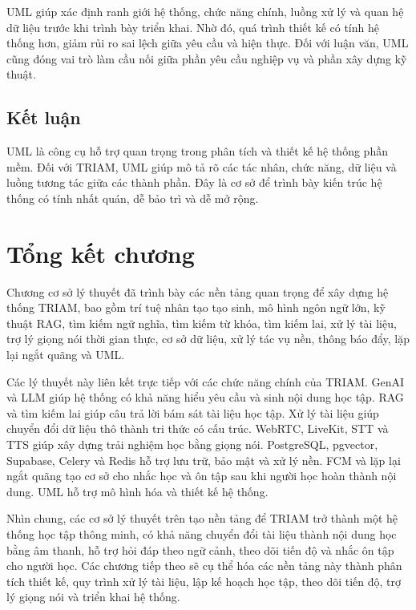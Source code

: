\documentclass[12pt,a4paper]{report}
\begin{document}
UML giúp xác định ranh giới hệ thống, chức năng chính, luồng xử lý và quan hệ dữ liệu trước khi trình bày triển khai. Nhờ đó, quá trình thiết kế có tính hệ thống hơn, giảm rủi ro sai lệch giữa yêu cầu và hiện thực. Đối với luận văn, UML cũng đóng vai trò làm cầu nối giữa phần yêu cầu nghiệp vụ và phần xây dựng kỹ thuật.

\subsection{Kết luận}

UML là công cụ hỗ trợ quan trọng trong phân tích và thiết kế hệ thống phần mềm. Đối với TRIAM, UML giúp mô tả rõ các tác nhân, chức năng, dữ liệu và luồng tương tác giữa các thành phần. Đây là cơ sở để trình bày kiến trúc hệ thống có tính nhất quán, dễ bảo trì và dễ mở rộng.

\section{Tổng kết chương}

Chương cơ sở lý thuyết đã trình bày các nền tảng quan trọng để xây dựng hệ thống TRIAM, bao gồm trí tuệ nhân tạo tạo sinh, mô hình ngôn ngữ lớn, kỹ thuật RAG, tìm kiếm ngữ nghĩa, tìm kiếm từ khóa, tìm kiếm lai, xử lý tài liệu, trợ lý giọng nói thời gian thực, cơ sở dữ liệu, xử lý tác vụ nền, thông báo đẩy, lặp lại ngắt quãng và UML.

Các lý thuyết này liên kết trực tiếp với các chức năng chính của TRIAM. GenAI và LLM giúp hệ thống có khả năng hiểu yêu cầu và sinh nội dung học tập. RAG và tìm kiếm lai giúp câu trả lời bám sát tài liệu học tập. Xử lý tài liệu giúp chuyển đổi dữ liệu thô thành tri thức có cấu trúc. WebRTC, LiveKit, STT và TTS giúp xây dựng trải nghiệm học bằng giọng nói. PostgreSQL, pgvector, Supabase, Celery và Redis hỗ trợ lưu trữ, bảo mật và xử lý nền. FCM và lặp lại ngắt quãng tạo cơ sở cho nhắc học và ôn tập sau khi người học hoàn thành nội dung. UML hỗ trợ mô hình hóa và thiết kế hệ thống.

Nhìn chung, các cơ sở lý thuyết trên tạo nền tảng để TRIAM trở thành một hệ thống học tập thông minh, có khả năng chuyển đổi tài liệu thành nội dung học bằng âm thanh, hỗ trợ hỏi đáp theo ngữ cảnh, theo dõi tiến độ và nhắc ôn tập cho người học. Các chương tiếp theo sẽ cụ thể hóa các nền tảng này thành phân tích thiết kế, quy trình xử lý tài liệu, lập kế hoạch học tập, theo dõi tiến độ, trợ lý giọng nói và triển khai hệ thống.
\end{document}
